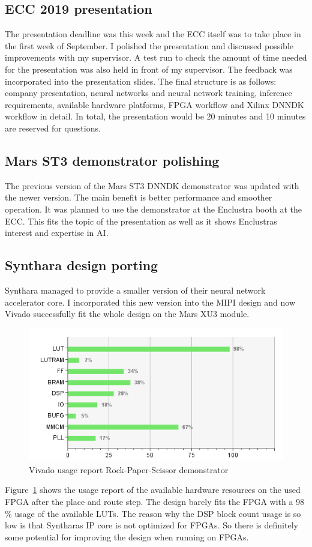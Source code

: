 \subsection{ECC 2019 presentation}
The presentation deadline was this week and the ECC itself was to take place in the first week of September. I polished the presentation and discussed possible improvements with my supervisor. A test run to check the amount of time needed for the presentation was also held in front of my supervisor. The feedback was incorporated into the presentation slides. The final structure is as follows: company presentation, neural networks and neural network training, inference requirements, available hardware platforms, \ac{FPGA} workflow and Xilinx \ac{DNNDK} workflow in detail. In total, the presentation would be 20 minutes and 10 minutes are reserved for questions.
\subsection{Mars ST3 demonstrator polishing}
The previous version of the Mars ST3 \ac{DNNDK} demonstrator was updated with the newer version. The main benefit is better performance and smoother operation. It was planned to use the demonstrator at the Enclustra booth at the ECC. This fits the topic of the presentation as well as it shows Enclustras interest and expertise in \ac{AI}.
\subsection{Synthara design porting}
Synthara managed to provide a smaller version of their neural network accelerator core. I incorporated this new version into the \ac{MIPI} design and now Vivado successfully fit the whole design on the Mars XU3 module.
\begin{figure}[!htb]
	\centering
		\includegraphics[width=\textwidth]{bilder/design_usage.png}
		\caption{Vivado usage report Rock-Paper-Scissor demonstrator}
		\label{fig:usage}
\end{figure}
Figure~\ref{fig:usage} shows the usage report of the available hardware resources on the used \ac{FPGA} after the place and route step. The design barely fits the \ac{FPGA} with a 98 \% usage of the available LUTs. The reason why the \ac{DSP} block count usage is so low is that Syntharas \ac{IP} core is not optimized for \acp{FPGA}. So there is definitely some potential for improving the design when running on \acp{FPGA}.